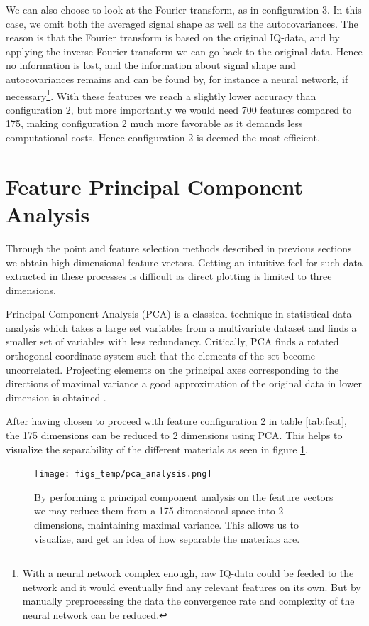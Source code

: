 We can also choose to look at the Fourier transform, as in configuration 3. In this case, we omit both the averaged signal shape as well as the autocovariances. The reason is that the Fourier transform is based on the original IQ-data, and by applying the inverse Fourier transform we can go back to the original data. Hence no information is lost, and the information about signal shape and autocovariances remains and can be found by, for instance a neural network, if necessary\footnote{With a neural network complex enough, raw IQ-data could be feeded to the network and it would eventually find any relevant features on its own. But by manually preprocessing the data the convergence rate and complexity of the neural network can be reduced.}. With these features we reach a slightly lower accuracy than configuration 2, but more importantly we would need 700 features compared to 175, making configuration 2 much more favorable as it demands less computational costs. Hence configuration 2 is deemed the most efficient.


\section{Feature Principal Component Analysis}

Through the point and feature selection methods described in previous sections we obtain high dimensional feature vectors. Getting an intuitive feel for such data extracted in these processes is difficult as direct plotting is limited to three dimensions. 

Principal Component Analysis (PCA) is  a classical technique in statistical data analysis which takes a large set variables from a multivariate dataset and finds a smaller set of variables with less redundancy. Critically, PCA finds a rotated orthogonal coordinate system such that the elements of the set become uncorrelated. Projecting elements on the principal axes corresponding to the directions of maximal variance a good approximation of the original data in lower dimension is obtained \citep{hyvasrinen_karhunen_oja_2004}.

After having chosen to proceed with feature configuration 2 in table \ref{tab:feat}, the 175 dimensions can be reduced to 2 dimensions using PCA. This helps to visualize the separability of the different materials as seen in figure \ref{fig:pca}.

\begin{figure}[h]
	\centering
	\texttt{[image: figs\_temp/pca\_analysis.png]}
	\caption{By performing a principal component analysis on the feature vectors we may reduce them from a 175-dimensional space into 2 dimensions, maintaining maximal variance. This allows us to visualize, and get an idea of how separable the materials are.}
	\label{fig:pca}
\end{figure}


